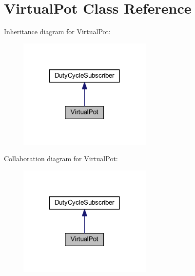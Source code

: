 \hypertarget{class_virtual_pot}{
\section{\-Virtual\-Pot \-Class \-Reference}
\label{class_virtual_pot}
}


\-Inheritance diagram for \-Virtual\-Pot\-:\nopagebreak
\begin{figure}[H]
\begin{center}
\leavevmode
\includegraphics[width=188pt]{class_virtual_pot__inherit__graph}
\end{center}
\end{figure}


\-Collaboration diagram for \-Virtual\-Pot\-:\nopagebreak
\begin{figure}[H]
\begin{center}
\leavevmode
\includegraphics[width=188pt]{class_virtual_pot__coll__graph}
\end{center}
\end{figure}
